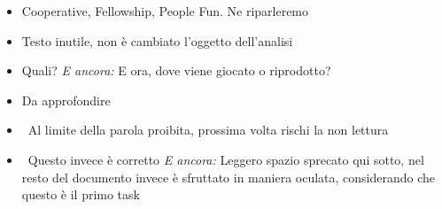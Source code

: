 {\begin{itemize}
  \item {} Cooperative, Fellowship, People Fun. Ne riparleremo
  \item {} Testo inutile, non è cambiato l'oggetto dell'analisi
  \item {} Quali? \emph{E ancora:} E ora, dove viene giocato o riprodotto?
  \item {} Da approfondire
  \item {} \rvAvviso\ Al limite della parola proibita, prossima volta rischi la non lettura
  \item {} \rvBene\ Questo invece è corretto \emph{E ancora:} Leggero spazio sprecato qui sotto, nel resto del documento invece è sfruttato in maniera oculata, considerando che questo è il primo task
\end{itemize}
}

